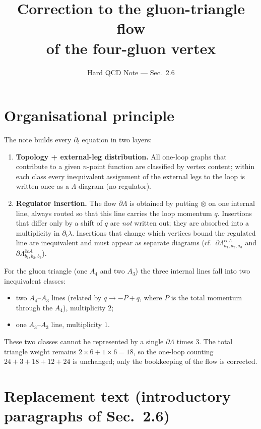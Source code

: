 \documentclass[11pt,a4paper]{article}
\title{Correction to the gluon-triangle flow\\ of the four-gluon vertex}
\author{Hard QCD Note --- Sec.~2.6}
\date{}
\begin{document}
\maketitle

\section*{Organisational principle}

The note builds every $\partial_t$ equation in two layers:

\begin{enumerate}
  \item \textbf{Topology + external-leg distribution.}
        All one-loop graphs that contribute to a given $n$-point function are
        classified by vertex content; within each class every inequivalent
        assignment of the external legs to the loop is written once as a
        $\Lambda$ diagram (no regulator).
  \item \textbf{Regulator insertion.}
        The flow $\partial\Lambda$ is obtained by putting $\otimes$ on one
        internal line, always routed so that this line carries the loop
        momentum $q$.  Insertions that differ only by a shift of $q$ are
        \emph{not} written out; they are absorbed into a multiplicity in
        $\partial_t\lambda$.  Insertions that change which vertices bound the
        regulated line are inequivalent and must appear as separate diagrams
        (cf.\ $\partial\Lambda^{\bar{c}cA}_{a_1,a_2,a_3}$ and
        $\partial\Lambda^{\bar{c}cA}_{b_1,b_2,b_3}$).
\end{enumerate}

For the gluon triangle (one $A_4$ and two $A_3$) the three internal lines fall
into two inequivalent classes:

\begin{itemize}
  \item two $A_4$--$A_3$ lines (related by $q\to -P+q$, where $P$ is the
        total momentum through the $A_4$), multiplicity $2$;
  \item one $A_3$--$A_3$ line, multiplicity $1$.
\end{itemize}

These two classes cannot be represented by a single $\partial\Lambda$ times $3$.
The total triangle weight remains $2\times 6 + 1\times 6 = 18$, so the
one-loop counting $24+3+18+12+24$ is unchanged; only the bookkeeping of the
flow is corrected.

\section{Replacement text (introductory paragraphs of Sec.~2.6)}
\end{document}
